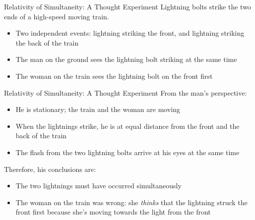 \documentclass[12pt,compress,aspectratio=169]{beamer}
\begin{document}
\begin{frame}{Relativity of Simultaneity: A Thought Experiment}
  Lightning bolts strike the two ends of a high-speed moving train.
  \begin{center}
    \vspace{-.1in}
  \end{center}
  \vspace{-.25in}
  \begin{itemize}
  \item Two independent events: lightning striking the front, and lightning
    striking the back of the train
  \item The man on the ground sees the lightning bolt striking at the same time
  \item The woman on the train sees the lightning bolt on the front first
  \end{itemize}
\end{frame}



\begin{frame}{Relativity of Simultaneity: A Thought Experiment}
  From the man's perspective:
  \begin{itemize}
  \item He is stationary; the train and the woman are moving
  \item When the lightnings strike, he is at equal distance from the front
    and the back of the train
  \item The flash from the two lightning bolts arrive at his eyes at the same
    time
  \end{itemize}
 
  \vspace{.1in}Therefore, his conclusions are:
  \begin{itemize}
  \item The two lightnings must have occurred simultaneously
  \item The woman on the train was wrong: she \emph{thinks} that the lightning
    struck the front first because she's moving towards the light from the front
  \end{itemize}
\end{frame}
\end{document}
